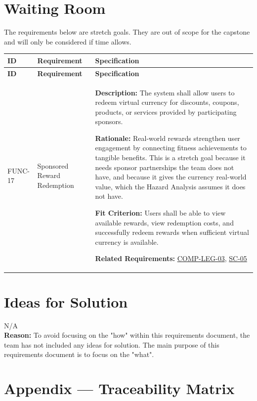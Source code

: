 \documentclass[12pt]{article}
\begin{document}
\section{Waiting Room}

The requirements below are stretch goals. They are out of scope for the
capstone and will only be considered if time allows.

\small
\setlength{\tabcolsep}{4pt}
\begin{xltabular}{\textwidth}{|p{2.6cm}|p{3.4cm}|X|}
\hline
\textbf{ID} & \textbf{Requirement} & \textbf{Specification} \\
\hline
\endfirsthead
\hline
\textbf{ID} & \textbf{Requirement} & \textbf{Specification} \\
\hline
\endhead

FUNC-17\hypertarget{req:FUNC-17}{} &
Sponsored Reward Redemption &
\textbf{Description:} The system shall allow users to redeem virtual currency for discounts, coupons, products, or services provided by participating sponsors.

\textbf{Rationale:} Real-world rewards strengthen user engagement by connecting fitness achievements to tangible benefits. This is a stretch goal because it needs sponsor partnerships the team does not have, and because it gives the currency real-world value, which the Hazard Analysis assumes it does not have.

\textbf{Fit Criterion:} Users shall be able to view available rewards, view redemption costs, and successfully redeem rewards when sufficient virtual currency is available.

\textbf{Related Requirements:} \hyperlink{req:COMP-LEG-03}{COMP-LEG-03}, \hyperlink{req:SC-05}{SC-05}\\
\hline

\end{xltabular}

\section{Ideas for Solution}
\noindent N/A \\
\textbf{Reason:} To avoid focusing on the "how" within this requirements document, the team has not included any ideas for solution. The main purpose of this requirements document is to focus on the "what".

\newpage{}
\section{Appendix --- Traceability Matrix}
\label{sec:traceability}
\end{document}
